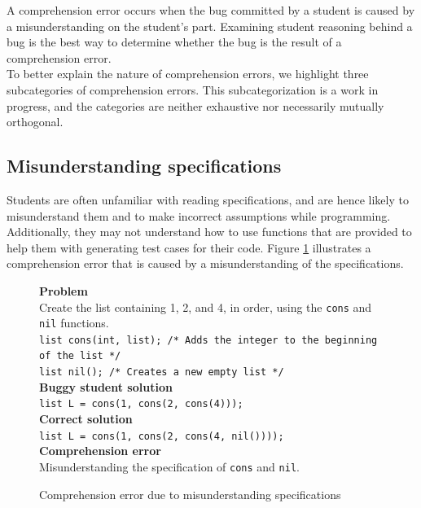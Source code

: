 \documentclass{sig-alternate}
\begin{document}
A comprehension error occurs when the bug committed by a student is caused by a misunderstanding on the student's part. Examining student reasoning behind a bug is the best way to determine whether the bug is the result of a comprehension error.\\

To better explain the nature of comprehension errors, we highlight three subcategories of comprehension errors. This subcategorization is a work in progress, and the categories are neither exhaustive nor necessarily mutually orthogonal.

\subsection{Misunderstanding specifications}
\label{sec:comp1}
Students are often unfamiliar with reading specifications, and are hence likely to misunderstand them and to make incorrect assumptions while programming. Additionally, they may not understand how to use functions that are provided to help them with generating test cases for their code. Figure \ref{fig:comp1} illustrates a comprehension error that is caused by a misunderstanding of the specifications.

\begin{figure}
\begin{framed}
\setlength{\parindent}{0cm}
\textbf{Problem}\\
Create the list containing 1, 2, and 4, in order, using the \texttt{cons} and \texttt{nil} functions.\\

\texttt{list cons(int, list); /* Adds the integer to the beginning of the list */\\ list nil(); /* Creates a new empty list */}\\

\textbf{Buggy student solution}\\
\texttt{list L = cons(1, cons(2, cons(4)));}\\

\textbf{Correct solution}\\
\texttt{list L = cons(1, cons(2, cons(4, nil())));}\\

\textbf{Comprehension error}\\
Misunderstanding the specification of \texttt{cons} and \texttt{nil}.
\end{framed}
\vspace{-0.1in}
\caption{Comprehension error due to misunderstanding specifications}
\label{fig:comp1}
\end{figure}
\end{document}
